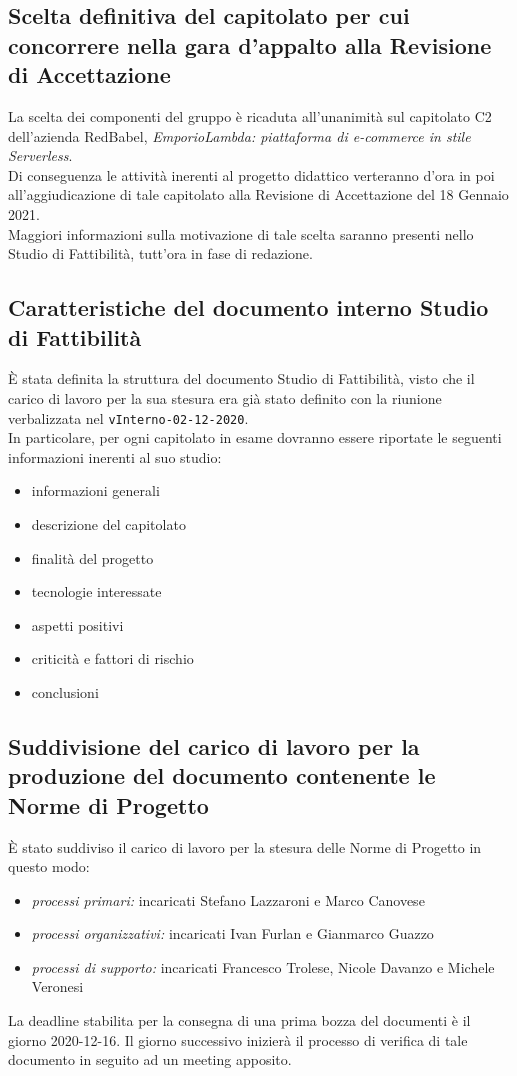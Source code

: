 \subsection{Scelta definitiva del capitolato per cui concorrere nella gara d'appalto alla Revisione di Accettazione}
	La scelta dei componenti del gruppo è ricaduta all'unanimità sul capitolato C2 dell'azienda RedBabel, \textit{EmporioLambda: piattaforma di e-commerce in stile Serverless}.\\
	Di conseguenza le attività inerenti al progetto didattico verteranno d'ora in poi all'aggiudicazione di tale capitolato alla Revisione di Accettazione del 18 Gennaio 2021.\\
	Maggiori informazioni sulla motivazione di tale scelta saranno presenti nello Studio di Fattibilità, tutt'ora in fase di redazione.
	
	\subsection{Caratteristiche del documento interno Studio di Fattibilità}
	È stata definita la struttura del documento Studio di Fattibilità, visto che il carico di lavoro per la sua stesura era già stato definito con la riunione verbalizzata nel \verb|vInterno-02-12-2020|.\\
	In particolare, per ogni capitolato in esame dovranno essere riportate le seguenti informazioni inerenti al suo studio:
	\begin{itemize}
		\item informazioni generali
		\item descrizione del capitolato
		\item finalità del progetto
		\item tecnologie interessate
		\item aspetti positivi
		\item criticità e fattori di rischio
		\item conclusioni
	\end{itemize}
	
	\subsection{Suddivisione del carico di lavoro per la produzione del documento contenente le Norme di Progetto}
	È stato suddiviso il carico di lavoro per la stesura delle Norme di Progetto in questo modo:
	\begin{itemize}
		\item \textit{processi primari:} incaricati Stefano Lazzaroni e Marco Canovese
		\item \textit{processi organizzativi:} incaricati Ivan Furlan e Gianmarco Guazzo
		\item \textit{processi di supporto:} incaricati Francesco Trolese, Nicole Davanzo e Michele Veronesi
	\end{itemize}
	La deadline stabilita per la consegna di una prima bozza del documenti è il giorno 2020-12-16. Il giorno successivo inizierà il processo di verifica di tale documento in seguito ad un meeting apposito.

